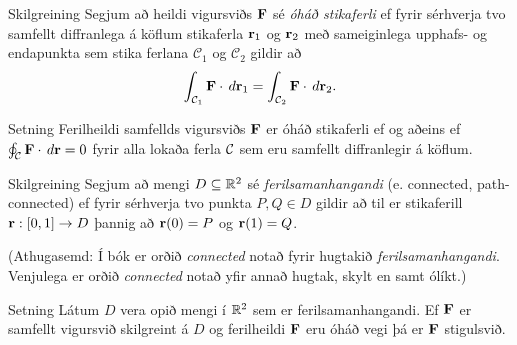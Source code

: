 \begin{frame}{} 

\begin {block}{Skilgreining \rtask{}}
 Segjum að heildi vigursviðs $\mbox{${\bf F}$}$ sé {\em
  óháð stikaferli} ef fyrir sérhverja tvo samfellt diffranlega á
köflum stikaferla $\mbox{${\bf r}$}_1$ og $\mbox{${\bf r}$}_2$ með sameiginlega upphafs- og
endapunkta sem stika ferlana $\mathcal{C}_1$ og $\mathcal{C}_2$ gildir að  
$$\int_{{\cal C}_1} \mbox{${\bf F}$}\cdot\,d\mbox{${\bf r}$}_1=
\int_{{\cal C}_2} \mbox{${\bf F}$}\cdot\,d\mbox{${\bf r}$}_2.$$ 
\end{block}

\end{frame}



\begin{frame}{} 

\begin {block}{Setning }
  Ferilheildi samfellds vigursviðs $\mbox{${\bf F}$}$ er óháð
stikaferli ef og aðeins ef $\oint_{\cal C} \mbox{${\bf F}$}\cdot\,d\mbox{${\bf r}$}=0$ fyrir alla
lokaða ferla $\cal C$ sem eru samfellt diffranlegir á köflum. 

\end{block}

\end{frame}



\begin{frame}{} 
\begin {block}{Skilgreining \rtask{}}
   Segjum að mengi $D\subseteq {\mathbb R}^2$ sé {\em
  ferilsamanhangandi} (e. connected, path-connected)  ef fyrir
  sérhverja tvo punkta $P, Q\in D$ gildir 
að til er stikaferill $\mbox{${\bf r}$}:[0,1]\rightarrow D$ þannig að $\mbox{${\bf r}$}(0)=P$ og
$\mbox{${\bf r}$}(1)=Q$.

\bigskip
(Athugasemd:  Í bók er orðið {\em connected} notað fyrir hugtakið {\em
  ferilsamanhangandi}.  Venjulega er orðið {\em connected} notað yfir
  annað hugtak, skylt en samt ólíkt.)
\end{block}

\end{frame}



\begin{frame}{} 

\begin {block}{ Setning  }
 Látum $D$ vera opið mengi í ${\mathbb R}^2$ sem er ferilsamanhangandi.  Ef $\mbox{${\bf F}$}$ er samfellt vigursvið skilgreint á $D$ og ferilheildi $\mbox{${\bf F}$}$ eru óháð vegi þá er $\mbox{${\bf F}$}$ stigulsvið.
    
\end{block}

\end{frame}




